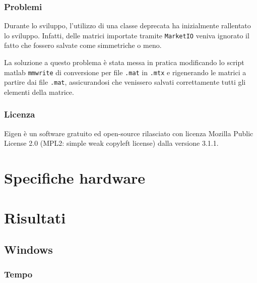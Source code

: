 \documentclass[11pt,italian]{article}
\begin{document}
\subsubsection{Problemi}
Durante lo sviluppo, l'utilizzo di una classe deprecata ha inizialmente rallentato lo sviluppo. Infatti, delle matrici importate tramite \lstinline{MarketIO} veniva ignorato il fatto che fossero salvate come simmetriche o meno.

La soluzione a questo problema è stata messa in pratica modificando lo script matlab \lstinline{mmwrite} di conversione per file \lstinline{.mat} in \lstinline{.mtx} e rigenerando le matrici a partire dai file \lstinline{.mat}, assicurandosi che venissero salvati correttamente tutti gli elementi della matrice.

\subsubsection{Licenza}
Eigen è un software gratuito ed open-source rilasciato con licenza Mozilla Public License 2.0 (MPL2: simple weak copyleft license) dalla versione 3.1.1.

\section{Specifiche hardware}

\section{Risultati}

\subsection{Windows}
\subsubsection*{Tempo}
\begin{figure}[H]
\end{figure}
\end{document}
